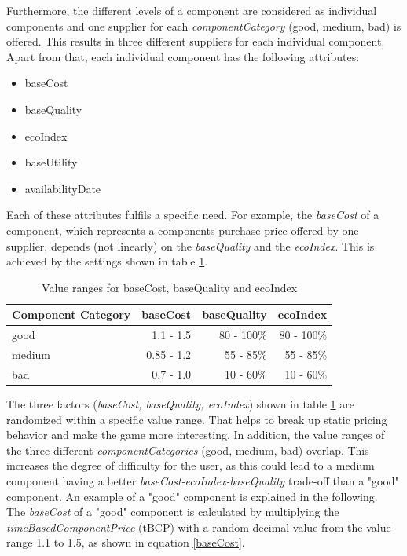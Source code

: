 Furthermore, the different levels of a component are considered as individual components and one supplier for each \textit{componentCategory} (good, medium, bad) is offered. This results in three different suppliers for each individual component.\\
Apart from that, each individual component has the following attributes:
\begin{itemize}
    \item baseCost
    \item baseQuality
    \item ecoIndex
    \item baseUtility
    \item availabilityDate
\end{itemize}
Each of these attributes fulfils a specific need. For example, the \textit{baseCost} of a component, which represents a components purchase price offered by one supplier, depends (not linearly) on the \textit{baseQuality} and the \textit{ecoIndex}. This is achieved by the settings shown in table \ref{component_price_calculation}.
    \begin{table}[ht]
    \centering
    \begin{tabular}{|l|r|r|r|}
    \hline
    Component Category & baseCost & baseQuality & ecoIndex \\
    \hline
    good & 1.1 - 1.5 & 80 - 100\% & 80 - 100\% \\
    medium & 0.85 - 1.2 & 55 - 85\% & 55 - 85\%\\
    bad  & 0.7 - 1.0 & 10 - 60\% & 10 - 60\%\\
    \hline
    \end{tabular}
    \caption{Value ranges for baseCost, baseQuality and ecoIndex}
    \label{component_price_calculation}
    \end{table}
\newline
The three factors (\textit{baseCost, baseQuality, ecoIndex}) shown in table \ref{component_price_calculation} are randomized within a specific value range. That helps to break up static pricing behavior and make the game more interesting. In addition, the value ranges of the three different \textit{componentCategories} (good, medium, bad) overlap. This increases the degree of difficulty for the user, as this could lead to a medium component having a better \textit{baseCost-ecoIndex-baseQuality} trade-off than a "good" component. An example of a "good" component is explained in the following.\\
The \textit{baseCost} of a "good" component is calculated by multiplying the \textit{timeBasedComponentPrice} (\gls{tBCP}) with a random decimal value from the value range 1.1 to 1.5, as shown in equation \ref{baseCost}.
